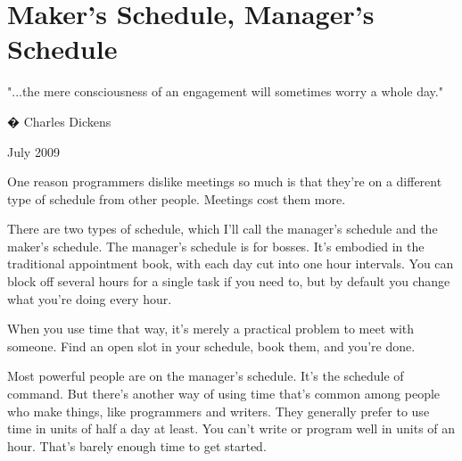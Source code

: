 \chapter{Maker's Schedule, Manager's Schedule}


            
              
                


                  
                    
                      
                        
                          
                            
                              
                                "...the mere consciousness of an engagement will
                                sometimes worry a whole day."

�
                                Charles Dickens
                              
                            
                          
                        
                      
                    
                  
                  
                    July 2009

One reason programmers dislike meetings
                    so much is that they're on a different type of schedule from
                    other people. Meetings cost them more.

There are
                    two types of schedule, which I'll call the manager's
                    schedule and the maker's schedule. The manager's schedule is
                    for bosses. It's embodied in the traditional appointment
                    book, with each day cut into one hour intervals. You can
                    block off several hours for a single task if you need to,
                    but by default you change what you're doing every hour.

When
                    you use time that way, it's merely a practical problem to
                    meet with someone. Find an open slot in your schedule, book
                    them, and you're done.

Most powerful people are
                    on the manager's schedule. It's the schedule of command. But
                    there's another way of using time that's common among people
                    who make things, like programmers and writers. They
                    generally prefer to use time in units of half a day at
                    least. You can't write or program well in units of an hour.
                    That's barely enough time to get started.

